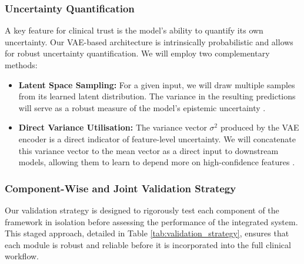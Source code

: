 \documentclass[11pt, a4paper]{article}
\begin{document}
\subsubsection{Uncertainty Quantification}
A key feature for clinical trust is the model's ability to quantify its own uncertainty. Our VAE-based architecture is intrinsically probabilistic and allows for robust uncertainty quantification. We will employ two complementary methods:
\begin{itemize}
    \item \textbf{Latent Space Sampling:} For a given input, we will draw multiple samples from its learned latent distribution. The variance in the resulting predictions will serve as a robust measure of the model's epistemic uncertainty \cite{BustinMeyer2025}.
    \item \textbf{Direct Variance Utilisation:} The variance vector $\sigma^2$ produced by the VAE encoder is a direct indicator of feature-level uncertainty. We will concatenate this variance vector to the mean vector as a direct input to downstream models, allowing them to learn to depend more on high-confidence features \cite{FriedrichFrisch2024}.
\end{itemize}

\subsubsection{Component-Wise and Joint Validation Strategy}
Our validation strategy is designed to rigorously test each component of the framework in isolation before assessing the performance of the integrated system. This staged approach, detailed in Table \ref{tab:validation_strategy}, ensures that each module is robust and reliable before it is incorporated into the full clinical workflow.
\end{document}
